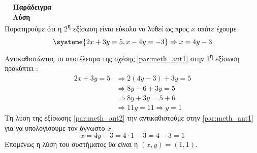 \documentclass[twoside,nofonts,internet,math,spyros]{frontisthrio}
\newcommand{\tss}[1]{\textsuperscript{#1}}
\begin{document}
\textbf{\large \textcolor{orange}{}\ \  Παράδειγμα}\\
\textbf{\large \textcolor{cyan}{}\ \  Λύση}\\
Παρατηρούμε ότι η 2\tss{η} εξίσωση είναι εύκολο να λυθεί ως προς $ x $ οπότε έχουμε
\begin{equation}\label{par:meth_ant1}
\systeme{2x+3y=5,x-4y=-3}\Rightarrow x=4y-3
\end{equation}
Αντικαθιστώντας το αποτέλεσμα της σχέσης \eqref{par:meth_ant1} στην 1\tss{η} εξίσωση προκύπτει :
\begin{align}
2x+3y=5&\Rightarrow 2(4y-3)+3y=5\nonumber\\&\Rightarrow 8y-6+3y=5\nonumber\\&\Rightarrow 8y+3y=5+6\nonumber\\&\Rightarrow 11y=11\Rightarrow y=1\label{par:meth_ant2}
\end{align}
Τη λύση της εξίσωσης \eqref{par:meth_ant2} την αντικαθιστούμε στην \eqref{par:meth_ant1} για να υπολογίσουμε τον άγνωστο $ x $
\[ x=4y-3=4\cdot1-3=4-3=1 \]
Επομένως η λύση του συστήματος θα είναι η $ (x,y)=(1,1) $.
\end{document}
